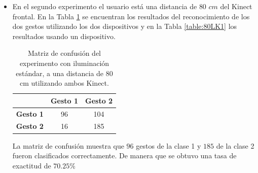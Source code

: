 \begin{itemize}
La matriz de confusión muestra que $127$ gestos de la clase 1 y $194$ de la clase 2 fueron clasificados correctamente. De manera que se obtuvo una tasa de exactitud de $80.25\%$. 
 
Como se observa en las matrices de confusión, se obtiene una mayor exactitud en el reconocimiento del gesto utilizando dos dispositivos Kinect.


\item En el segundo experimento el usuario est\'a una distancia de $80$ $cm$ del Kinect frontal. En la Tabla \ref{table:80LK2} se encuentran los resultados del reconocimiento de los dos gestos utilizando los dos dispositivos y en la Tabla \ref{table:80LK1} los resultados usando un dispositivo.   


\begin{table}[h!] 
\begin{center}
\caption{Matriz de confusión del experimento con iluminación estándar, a una distancia de 80 cm utilizando ambos Kinect.} 
\label{table:80LK2}
\renewcommand{\arraystretch}{1.2}
\begin{tabular}{ r || c  c } 
        & \textbf{Gesto 1} & \textbf{Gesto 2} \\ \hline \hline  
\textbf{Gesto 1} & 96     &  104     \\ \hline  
\textbf{Gesto 2} & 16     & 185     \\   
\end{tabular}
\end{center} 
\end{table}

La matriz de confusión muestra que $96$ gestos de la clase 1 y $185$ de la clase 2 fueron clasificados correctamente. De manera que se obtuvo una tasa de exactitud de $70.25\%$  


\end{itemize}
